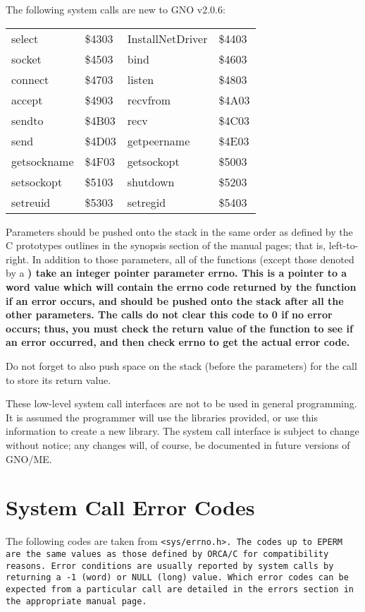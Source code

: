 \documentclass{report}
\begin{document}
The following system calls are new to GNO v2.0.6:

\begin{tabular}{llll}
	select			& \$4303	&
	InstallNetDriver	& \$4403	\\
	socket			& \$4503	&
	bind			& \$4603	\\
	connect			& \$4703	&
	listen			& \$4803	\\
	accept			& \$4903	&
	recvfrom		& \$4A03	\\
	sendto			& \$4B03	&
	recv			& \$4C03	\\
	send			& \$4D03	&
	getpeername		& \$4E03	\\
	getsockname		& \$4F03	&
	getsockopt		& \$5003	\\
	setsockopt		& \$5103	&
	shutdown		& \$5203	\\
	setreuid		& \$5303	&
	setregid		& \$5403	\\
\end{tabular}

Parameters should be pushed onto the stack
in the same order as defined by the C prototypes outlines in the
synopsis section of the manual pages; that is, left-to-right. In
addition to those parameters, all of the functions (except those
denoted by a \bf *\rm) take an integer pointer parameter \bf errno\rm.
This is a pointer to a word value which will contain the \bf errno \rm
code returned by the function if an error occurs, and should be
pushed onto the stack after all the other parameters. The calls
do not clear this code to 0 if no error occurs; thus, you must
check the return value of the function to see if an error
occurred, and then check errno to get the actual error code.

Do not forget to also push space on the
stack (before the parameters) for the call to store its return
value.

These low-level system call interfaces are
not to be used in general programming. It is assumed the
programmer will use the libraries provided, or use this
information to create a new library. The system call interface is
subject to change without notice; any changes will, of course, be
documented in future versions of GNO/ME.

\section{System Call Error Codes}

The following codes are taken from \tt <sys/errno.h>\rm. The
codes up to EPERM are the same values as those defined by ORCA/C
for compatibility reasons. Error conditions are usually reported
by system calls by returning a -1 (word) or NULL (long) value.
Which error codes can be expected from a particular call are
detailed in the errors section in the appropriate manual page.
\end{document}
